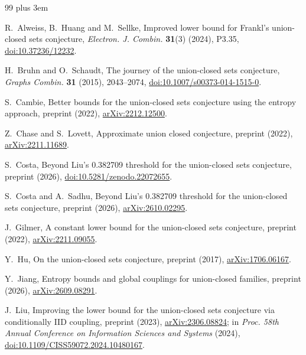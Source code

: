 \documentclass[12pt]{article}
\theoremstyle{plain}
\begin{document}
\begin{thebibliography}{99}\rightskip=0pt plus 3em

 R.~Alweiss, B.~Huang and M.~Sellke, Improved lower bound for Frankl's union-closed sets conjecture, \emph{Electron. J. Combin.} \textbf{31}(3) (2024), P3.35, \href{https://doi.org/10.37236/12232}{doi:10.37236/12232}.

 H.~Bruhn and O.~Schaudt, The journey of the union-closed sets conjecture, \emph{Graphs Combin.} \textbf{31} (2015), 2043--2074, \href{https://doi.org/10.1007/s00373-014-1515-0}{doi:10.1007/s00373-014-1515-0}.

 S.~Cambie, Better bounds for the union-closed sets conjecture using the entropy approach, preprint (2022), \href{https://arxiv.org/abs/2212.12500}{arXiv:2212.12500}.

 Z.~Chase and S.~Lovett, Approximate union closed conjecture, preprint (2022), \href{https://arxiv.org/abs/2211.11689}{arXiv:2211.11689}.

 S.~Costa, Beyond Liu's 0.382709 threshold for the union-closed sets conjecture, preprint (2026), \href{https://doi.org/10.5281/zenodo.22072655}{doi:10.5281/zenodo.22072655}.

 S.~Costa and A.~Sadhu, Beyond Liu's 0.382709 threshold for the union-closed sets conjecture, preprint (2026), \href{https://arxiv.org/abs/2610.02295}{arXiv:2610.02295}.

 J.~Gilmer, A constant lower bound for the union-closed sets conjecture, preprint (2022), \href{https://arxiv.org/abs/2211.09055}{arXiv:2211.09055}.

 Y.~Hu, On the union-closed sets conjecture, preprint (2017), \href{https://arxiv.org/abs/1706.06167}{arXiv:1706.06167}.

 Y.~Jiang, Entropy bounds and global couplings for union-closed families, preprint (2026), \href{https://arxiv.org/abs/2609.08291}{arXiv:2609.08291}.

 J.~Liu, Improving the lower bound for the union-closed sets conjecture via conditionally IID coupling, preprint (2023), \href{https://arxiv.org/abs/2306.08824}{arXiv:2306.08824}; in \emph{Proc. 58th Annual Conference on Information Sciences and Systems} (2024), \href{https://doi.org/10.1109/CISS59072.2024.10480167}{doi:10.1109/CISS59072.2024.10480167}.


\end{thebibliography}
\end{document}
